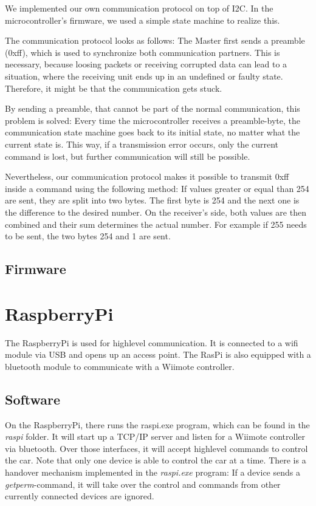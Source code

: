 \documentclass[a4paper
               ,10pt
               ,DIV=10 %
               ,BCOR=0.3cm
               ,pagesize %
               ,headings=small
               ,bibtotoc
               ]
               {scrartcl}
\begin{document}
We implemented our own communication protocol on top of I2C.
In the microcontroller's firmware, we used a simple state machine to realize this.

The communication protocol looks as follows:
The Master first sends a preamble (0xff), which is used to synchronize both communication partners.
This is necessary, because loosing packets or receiving corrupted data can lead to a situation, where the receiving unit ends up in an undefined or faulty state.
Therefore, it might be that the communication gets stuck.

By sending a preamble, that cannot be part of the normal communication, this problem is solved: Every time the microcontroller receives a preamble-byte, the communication state machine goes back to its initial state, no matter what the current state is.
This way, if a transmission error occurs, only the current command is lost, but further communication will still be possible.


Nevertheless, our communication protocol makes it possible to transmit 0xff inside a command using the following method:
If values greater or equal than 254 are sent, they are split into two bytes.
The first byte is 254 and the next one is the difference to the desired number.
On the receiver's side, both values are then combined and their sum determines the actual number. 
For example if 255 needs to be sent, the two bytes 254 and 1 are sent.

\subsection{Firmware}

\section{RaspberryPi}
The RaspberryPi is used for highlevel communication.
It is connected to a wifi module via USB and opens up an access point.
The RasPi is also equipped with a bluetooth module to communicate with a Wiimote controller.

\subsection{Software}
On the RaspberryPi, there runs the raspi.exe program, which can be found in the \textit{raspi} folder.
It will start up a TCP/IP server and listen for a Wiimote controller via bluetooth.
Over those interfaces, it will accept highlevel commands to control the car.
Note that only one device is able to control the car at a time.
There is a handover mechanism implemented in the \textit{raspi.exe} program: If a device sends a \textit{getperm}-command, it will take over the control and commands from other currently connected devices are ignored.
\end{document}
